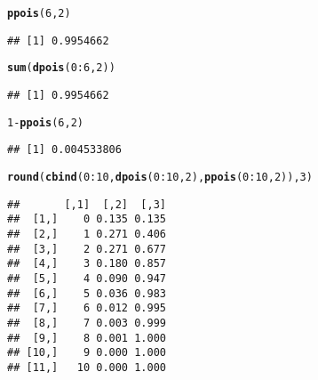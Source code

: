 \documentclass{article}\usepackage[]{graphicx}\usepackage[]{xcolor}
\makeatletter
\newcommand{\hlnum}[1]{\textcolor[rgb]{0.686,0.059,0.569}{#1}}%
\newcommand{\hlopt}[1]{\textcolor[rgb]{0,0,0}{#1}}%
\newcommand{\hldef}[1]{\textcolor[rgb]{0.345,0.345,0.345}{#1}}%
\newcommand{\hlkwd}[1]{\textcolor[rgb]{0.737,0.353,0.396}{\textbf{#1}}}%
\newenvironment{kframe}{%
 \def\at@end@of@kframe{}%
 \ifinner\ifhmode%
  \def\at@end@of@kframe{\end{minipage}}%
  \begin{minipage}{\columnwidth}%
 \fi\fi%
 \def\FrameCommand##1{\hskip\@totalleftmargin \hskip-\fboxsep
 \colorbox{shadecolor}{##1}\hskip-\fboxsep
     \hskip-\linewidth \hskip-\@totalleftmargin \hskip\columnwidth}%
 \MakeFramed {\advance\hsize-\width
   \@totalleftmargin\z@ \linewidth\hsize
   \@setminipage}}%
 {\par\unskip\endMakeFramed%
 \at@end@of@kframe}
\newenvironment{knitrout}{}{} %
\makeatother
\begin{document}
\begin{knitrout}
\color{fgcolor}\begin{kframe}
\begin{alltt}
\hlkwd{ppois}\hldef{(}\hlnum{6}\hldef{,} \hlnum{2}\hldef{)}
\end{alltt}
\begin{verbatim}
## [1] 0.9954662
\end{verbatim}
\end{kframe}
\end{knitrout}
\begin{knitrout}
\color{fgcolor}\begin{kframe}
\begin{alltt}
\hlkwd{sum}\hldef{(}\hlkwd{dpois}\hldef{(}\hlnum{0}\hlopt{:}\hlnum{6}\hldef{,} \hlnum{2}\hldef{))}
\end{alltt}
\begin{verbatim}
## [1] 0.9954662
\end{verbatim}
\end{kframe}
\end{knitrout}
\begin{knitrout}
\color{fgcolor}\begin{kframe}
\begin{alltt}
\hlnum{1} \hlopt{-} \hlkwd{ppois}\hldef{(}\hlnum{6}\hldef{,} \hlnum{2}\hldef{)}
\end{alltt}
\begin{verbatim}
## [1] 0.004533806
\end{verbatim}
\end{kframe}
\end{knitrout}
%
\begin{knitrout}
\color{fgcolor}\begin{kframe}
\begin{alltt}
\hlkwd{round}\hldef{(}\hlkwd{cbind}\hldef{(}\hlnum{0}\hlopt{:}\hlnum{10}\hldef{,} \hlkwd{dpois}\hldef{(}\hlnum{0}\hlopt{:}\hlnum{10} \hldef{,}\hlnum{2}\hldef{),} \hlkwd{ppois}\hldef{(}\hlnum{0}\hlopt{:}\hlnum{10}\hldef{,} \hlnum{2}\hldef{)) ,}\hlnum{3}\hldef{)}
\end{alltt}
\begin{verbatim}
##       [,1]  [,2]  [,3]
##  [1,]    0 0.135 0.135
##  [2,]    1 0.271 0.406
##  [3,]    2 0.271 0.677
##  [4,]    3 0.180 0.857
##  [5,]    4 0.090 0.947
##  [6,]    5 0.036 0.983
##  [7,]    6 0.012 0.995
##  [8,]    7 0.003 0.999
##  [9,]    8 0.001 1.000
## [10,]    9 0.000 1.000
## [11,]   10 0.000 1.000
\end{verbatim}
\end{kframe}
\end{knitrout}
\end{document}
